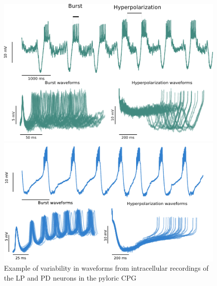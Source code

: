 

\begin{figure}[hbt]
	\centering
	\begin{minipage}{0.45\textwidth}
	\includegraphics[width=\textwidth]{img/invariants/variability/lp_burst_variability.pdf}
	\end{minipage}
	\begin{minipage}{0.45\textwidth}
	\includegraphics[width=\textwidth]{img/invariants/variability/pd_burst_variability.pdf}
	\end{minipage}
	\caption{Example of variability in waveforms from intracellular recordings of the LP and PD neurons in the pyloric CPG}
	\label{fig:lp-pd burst variability}
\end{figure}



